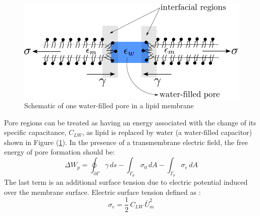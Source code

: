 \documentclass[english,12pt]{article}
\begin{document}


\begin{figure}[H]
	\centering
	\includegraphics[scale=0.8]{pics/pore1_1.pdf}
	\caption{\footnotesize{Schematic of one water-filled pore in a lipid membrane}}
	\label{fig:pore1}
\end{figure}
Pore regions can be treated as having an energy associated with the change of its specific capacitance, $C_{LW}$, as lipid is replaced by water (a water-filled capacitor) shown in Figure (\ref{fig:pore1}). 
In the presence of a transmembrane electric field, the free energy of pore formation should be:
\begin{equation}
\Delta W_{p} = \oint_{\partial\Gamma}\gamma\,ds - \int_{\Gamma_p}\sigma_0\,dA-\int_{\Gamma_p}\sigma_e\,dA 
\label{eqn:poreenergy}
\end{equation}
The last term is an additional surface tension due to electric potential induced over the membrane surface. Electric surface tension defined as \cite{Weaver1996135}:
\begin{equation}
	\sigma_e=\frac{1}{2}\,C_{LW}\,\bar{U}_{m}^{2}
	\label{eqn:elecsurface}
\end{equation}
\end{document}
